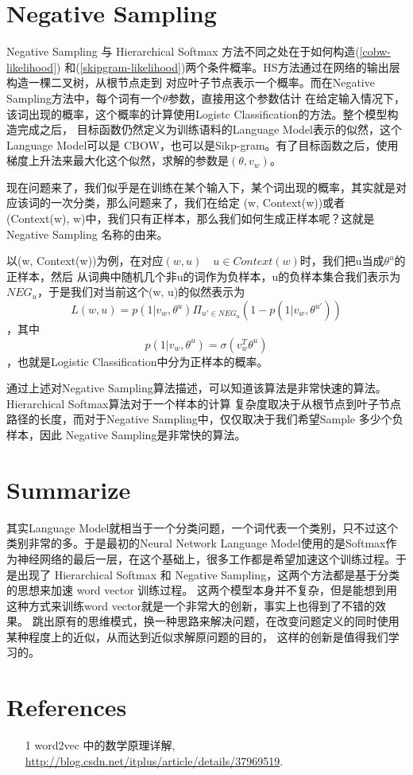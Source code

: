 \documentclass[UTF8]{ctexart}
\begin{document}
\section{Negative Sampling}
Negative Sampling 与 Hierarchical Softmax 方法不同之处在于如何构造(\ref{cobw-likelihood})
和(\ref{skipgram-likelihood})两个条件概率。HS方法通过在网络的输出层构造一棵二叉树，从根节点走到
对应叶子节点表示一个概率。而在Negative Sampling方法中，每个词有一个$\theta$参数，直接用这个参数估计
在给定输入情况下，该词出现的概率，这个概率的计算使用Logistc Classification的方法。整个模型构造完成之后，
目标函数仍然定义为训练语料的Language Model表示的似然，这个Language Model可以是
CBOW，也可以是Sikp-gram。有了目标函数之后，使用梯度上升法来最大化这个似然，求解的参数是$(\theta, v_w)$。
\par
现在问题来了，我们似乎是在训练在某个输入下，某个词出现的概率，其实就是对应该词的一次分类，那么问题来了，我们在给定
(w, Context(w))或者(Context(w), w)中，我们只有正样本，那么我们如何生成正样本呢？这就是Negative Sampling
名称的由来。
\par
以(w, Context(w))为例，在对应$(w, u)\quad u\in Context(w)$时，我们把u当成$\theta^u$的正样本，然后
从词典中随机几个非u的词作为负样本，u的负样本集合我们表示为$NEG_u$，于是我们对当前这个(w, u)的似然表示为
\[ L(w, u) = p(1|v_w, \theta^u) \Pi_{u' \in NEG_u}(1-p(1|v_w, \theta^{u'}))\]，其中
\[ p(1|v_w, \theta^u) = \sigma(v_w^T\theta^u)\]，也就是Logistic Classification中分为正样本的概率。
\par
通过上述对Negative Sampling算法描述，可以知道该算法是非常快速的算法。Hierarchical Softmax算法对于一个样本的计算
复杂度取决于从根节点到叶子节点路径的长度，而对于Negative Sampling中，仅仅取决于我们希望Sample 多少个负样本，因此
Negative Sampling是非常快的算法。

\section{Summarize}
其实Language Model就相当于一个分类问题，一个词代表一个类别，只不过这个类别非常的多。于是最初的Neural Network Language
Model使用的是Softmax作为神经网络的最后一层，在这个基础上，很多工作都是希望加速这个训练过程。于是出现了
Hierarchical Softmax 和 Negative Sampling，这两个方法都是基于分类的思想来加速 word vector 训练过程。
这两个模型本身并不复杂，但是能想到用这种方式来训练word vector就是一个非常大的创新，事实上也得到了不错的效果。
跳出原有的思维模式，换一种思路来解决问题，在改变问题定义的同时使用某种程度上的近似，从而达到近似求解原问题的目的，
这样的创新是值得我们学习的。

\section{References}
\begin{itemize}
\item[1] word2vec 中的数学原理详解, \\
\url{http://blog.csdn.net/itplus/article/details/37969519}.
\end{itemize}
\end{document}
